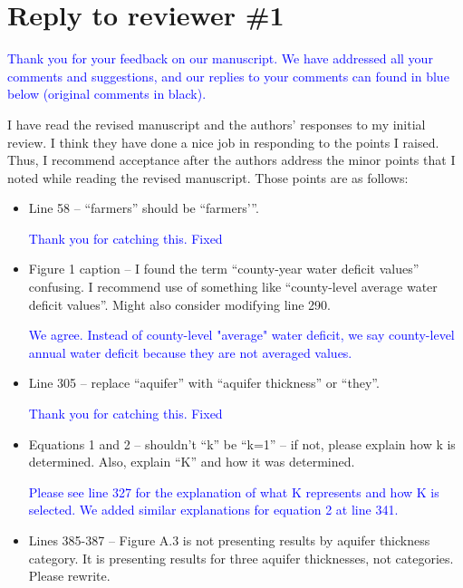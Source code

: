 \documentclass[
]{article}
\author{}
\date{\vspace{-2.5em}}
\begin{document}
\section{Reply to reviewer \#1}

\textcolor{blue}{Thank you for your feedback on our manuscript. We have addressed all your comments and suggestions, and our replies to your comments can found in blue below (original comments in black).}

I have read the revised manuscript and the authors’ responses to my initial review. I think they have done a nice job in responding to the points I raised. Thus, I recommend acceptance after the authors address the minor points that I noted while reading the revised manuscript. Those points are as follows:

\begin{itemize}
    \item Line 58 – ``farmers'' should be ``farmers’''.

\textcolor{blue}{Thank you for catching this. Fixed}

\item Figure 1 caption – I found the term ``county-year water deficit values'' confusing. I recommend use of something like ``county-level average water deficit values''. Might also consider modifying line 290.

\textcolor{blue}{We agree. Instead of county-level "average" water deficit, we say county-level annual water deficit because they are not averaged values.}

\item Line 305 – replace ``aquifer'' with ``aquifer thickness'' or ``they''.

\textcolor{blue}{Thank you for catching this. Fixed}

\item Equations 1 and 2 – shouldn’t ``k'' be ``k=1'' – if not, please explain how k is determined. Also, explain ``K'' and how it was determined.

\textcolor{blue}{Please see line 327 for the explanation of what K represents and how K is selected. We added similar explanations for equation 2 at line 341.}

\item Lines 385-387 – Figure A.3 is not presenting results by aquifer thickness category. It is presenting results for three aquifer thicknesses, not categories. Please rewrite.


\end{itemize}
\end{document}
